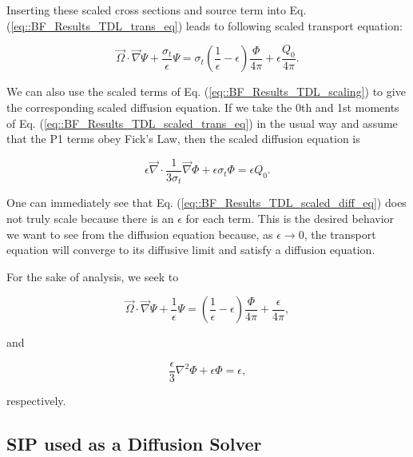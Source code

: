 \noindent Inserting these scaled cross sections and source term into Eq. (\ref{eq::BF_Results_TDL_trans_eq}) leads to following scaled transport equation:

\begin{equation}
\label{eq::BF_Results_TDL_scaled_trans_eq}
\vec{\Omega} \cdot \vec{\nabla} \Psi + \frac{\sigma_t}{\epsilon} \Psi = \sigma_t \left( \frac{1}{\epsilon} - \epsilon   \right)  \frac{\Phi}{4 \pi} + \epsilon \frac{Q_0}{4 \pi} .
\end{equation}

\noindent We can also use the scaled terms of Eq. (\ref{eq::BF_Results_TDL_scaling}) to give the corresponding scaled diffusion equation. If we take the 0th and 1st moments of Eq. (\ref{eq::BF_Results_TDL_scaled_trans_eq}) in the usual way and assume that the P1 terms obey Fick's Law, then the scaled diffusion equation is

\begin{equation}
\label{eq::BF_Results_TDL_scaled_diff_eq}
\epsilon \vec{\nabla} \cdot \frac{1}{3 \sigma_t}  \vec{\nabla} \Phi + \epsilon \sigma_t \Phi =  \epsilon Q_0.
\end{equation}

\noindent One can immediately see that Eq. (\ref{eq::BF_Results_TDL_scaled_diff_eq}) does not truly scale because there is an $\epsilon$ for each term. This is the desired behavior we want to see from the diffusion equation because, as $\epsilon \rightarrow 0$, the transport equation will converge to its diffusive limit and satisfy a diffusion equation.

For the sake of analysis, we seek to 

\begin{equation}
\label{eq::BF_Results_TDL_normalized_trans_eq}
\vec{\Omega} \cdot \vec{\nabla} \Psi + \frac{1}{\epsilon} \Psi =  \left( \frac{1}{\epsilon} - \epsilon   \right)  \frac{\Phi}{4 \pi} +  \frac{\epsilon}{4 \pi} ,
\end{equation}

\noindent and

\begin{equation}
\label{eq::BF_Results_TDL_normalized_diff_eq}
\frac{\epsilon}{3} {\nabla}^2 \Phi + \epsilon  \Phi =  \epsilon ,
\end{equation}

\noindent respectively.

\subsection{SIP used as a Diffusion Solver}
\label{sec::DSA_Results_SIP}

